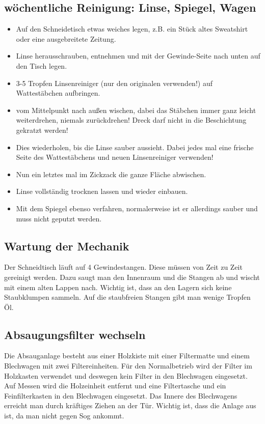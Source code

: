 \documentclass{\basedir/fablab-document}
\renewcommand{\todo}[1]{\textbf{\color{red}{TODO: #1}}}
\begin{document}
\subsection{wöchentliche Reinigung: Linse, Spiegel, Wagen}
\begin{itemize}
\label{linsenreinigung}
 \item Auf den Schneidetisch etwas weiches legen, z.B. ein Stück altes Sweatshirt oder eine ausgebreitete Zeitung.
 \item Linse herausschrauben, entnehmen und mit der Gewinde-Seite nach unten auf den Tisch legen.
 \item 3-5 Tropfen Linsenreiniger (nur den originalen verwenden!) auf Wattestäbchen aufbringen.
 \item vom Mittelpunkt nach außen wischen, dabei das Stäbchen immer ganz leicht weiterdrehen, niemals zurückdrehen! Dreck darf nicht in die Beschichtung gekratzt werden!
 \item Dies wiederholen, bis die Linse sauber aussieht. Dabei jedes mal eine frische Seite des Wattestäbchens und neuen Linsenreiniger verwenden!
 \item Nun ein letztes mal im Zickzack die ganze Fläche abwischen.
 \item Linse vollständig trocknen lassen und wieder einbauen.
 \item Mit dem Spiegel ebenso verfahren, normalerweise ist er allerdings sauber und muss nicht geputzt werden.
\end{itemize}

\subsection{Wartung der Mechanik}
Der Schneidtisch läuft auf 4 Gewindestangen. Diese müssen von Zeit zu Zeit gereinigt werden. Dazu saugt man den Innenraum und die Stangen ab und wischt mit einem alten Lappen nach. Wichtig ist, dass an den Lagern sich keine Staubklumpen sammeln. Auf die staubfreien Stangen gibt man wenige Tropfen Öl.
\subsection{Absaugungsfilter wechseln}
\todo{Beschreibung ist veraltet}
Die Absauganlage besteht aus einer Holzkiste mit einer Filtermatte und einem Blechwagen mit zwei Filtereinheiten. Für den Normalbetrieb wird der Filter im Holzkasten verwendet und deswegen kein Filter in den Blechwagen eingesetzt. Auf Messen wird die Holzeinheit entfernt und eine Filtertasche und ein Feinfilterkasten in den Blechwagen eingesetzt. Das Innere des Blechwagens erreicht man durch kräftiges Ziehen an der Tür. Wichtig ist, dass die Anlage aus ist, da man nicht gegen Sog ankommt.
\end{document}
